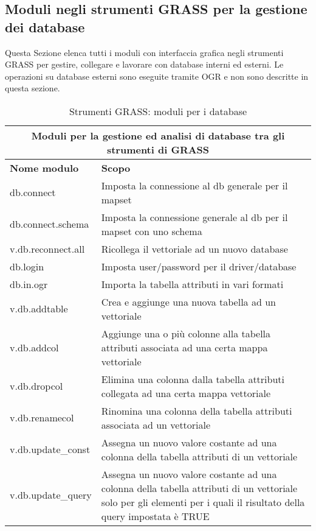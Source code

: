 \clearpage

\subsection{Moduli negli strumenti GRASS per la gestione dei database}

Questa Sezione elenca tutti i moduli con interfaccia grafica negli strumenti GRASS per gestire, collegare e lavorare con database interni ed esterni. Le operazioni su database esterni sono eseguite tramite OGR e non sono descritte in questa sezione.

\begin{table}[ht]
\centering
\caption{Strumenti GRASS: moduli per i database}\medskip
 \begin{tabular}{|p{4cm}|p{12cm}|}
  \hline \multicolumn{2}{|c|}{\textbf{Moduli per la gestione ed analisi di database tra gli strumenti di GRASS}} \\
  \hline \textbf{Nome modulo} & \textbf{Scopo} \\
  \hline db.connect & Imposta la connessione al db generale per il mapset \\
  \hline db.connect.schema & Imposta la connessione generale al db per il mapset con uno schema \\
  \hline v.db.reconnect.all & Ricollega il vettoriale ad un nuovo database \\
  \hline db.login & Imposta user/password per il driver/database \\
  \hline db.in.ogr & Importa la tabella attributi in vari formati \\
  \hline v.db.addtable & Crea e aggiunge una nuova tabella ad un vettoriale \\
  \hline v.db.addcol & Aggiunge una o più colonne alla tabella attributi associata ad una certa mappa vettoriale \\
  \hline v.db.dropcol & Elimina una colonna dalla tabella attributi collegata ad una certa mappa vettoriale \\
  \hline v.db.renamecol & Rinomina una colonna della tabella attributi associata ad un vettoriale \\
  \hline v.db.update\_const & Assegna un nuovo valore costante ad una colonna della tabella attributi di un vettoriale \\
  \hline v.db.update\_query & Assegna un nuovo valore costante ad una colonna della tabella attributi di un vettoriale solo per gli elementi per i quali il risultato della query impostata è TRUE \\

\end{tabular}
\end{table}
